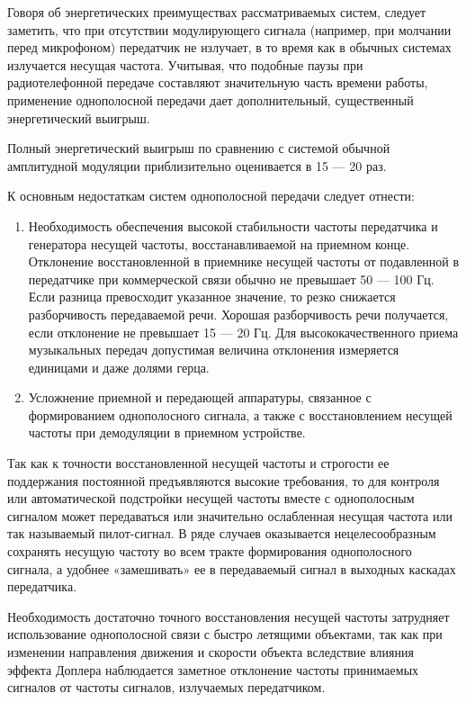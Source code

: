 Говоря об энергетических преимуществах рассматриваемых систем, следует заметить, что при отсутствии модулирующего сигнала (например, при молчании перед микрофоном) передатчик не излучает, в то время как в обычных системах излучается несущая частота. Учитывая, что подобные паузы при радиотелефонной передаче составляют значительную часть времени работы, применение однополосной передачи дает дополнительный, существенный энергетический выигрыш.

Полный энергетический выигрыш по сравнению с системой обычной амплитудной модуляции приблизительно оценивается в 15 — 20 раз. 

К основным недостаткам систем однополосной передачи следует отнести:
\begin{enumerate}
	\item Необходимость обеспечения высокой стабильности частоты передатчика и генератора несущей частоты, восстанавливаемой на приемном конце. Отклонение восстановленной в приемнике несущей частоты от подавленной в передатчике при коммерческой связи обычно не превышает 50 — 100 Гц. Если разница превосходит указанное значение, то резко снижается
разборчивость передаваемой речи. Хорошая разборчивость речи получается, если отклонение не превышает 15 — 20 Гц. Для высококачественного приема музыкальных передач допустимая величина отклонения измеряется единицами и даже долями герца.
	\item Усложнение приемной и передающей аппаратуры, связанное с формированием однополосного сигнала, а также с восстановлением несущей частоты при демодуляции в приемном устройстве. 
\end{enumerate}
Так как к точности восстановленной несущей частоты и строгости ее поддержания постоянной предъявляются высокие требования, то для контроля или автоматической подстройки несущей частоты вместе с однополосным сигналом может передаваться или значительно ослабленная несущая частота или так называемый пилот-сигнал. В ряде случаев оказывается нецелесообразным сохранять несущую частоту во всем тракте формирования однополосного сигнала, а удобнее «замешивать» ее в передаваемый сигнал в выходных каскадах передатчика.

Необходимость достаточно точного восстановления несущей частоты затрудняет использование однополосной связи с быстро летящими объектами, так как при изменении направления движения и скорости объекта вследствие влияния эффекта Доплера наблюдается заметное отклонение частоты принимаемых сигналов от частоты сигналов, излучаемых передатчиком.

